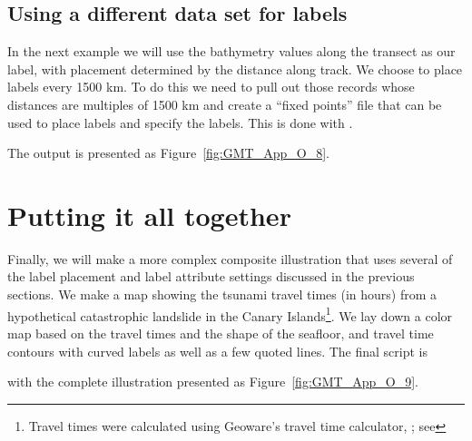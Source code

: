 \subsection{Using a different data set for labels}

In the next example we will use the bathymetry values along the transect as
our label, with placement determined by the distance along track.  We choose
to place labels every 1500 km.  To do this we need to pull out those records
whose distances are multiples of 1500 km and create a ``fixed points'' file
that can be used to place labels and specify the labels.  This is done with
.


\noindent
The output is presented as Figure~\ref{fig:GMT_App_O_8}.


\section{Putting it all together}

Finally, we will make a more complex composite illustration that uses several of the
label placement and label attribute settings discussed in the previous sections.  We
make a map showing the tsunami travel times (in hours) from a hypothetical catastrophic
landslide in the Canary Islands\footnote{Travel times were calculated using Geoware's
travel time calculator, ;
see }.
We lay down a color map based on the travel times
and the shape of the seafloor, and travel time contours with curved labels as well
as a few quoted lines.  The final script is


\noindent
with the complete illustration presented as Figure~\ref{fig:GMT_App_O_9}.
